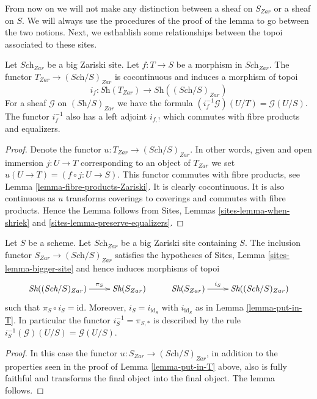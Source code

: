 \noindent
From now on we will not make any distinction between a sheaf on
$S_{Zar}$ or a sheaf on $S$. We will always use the procedures
of the proof of the lemma to go between the two notions.
Next, we esthablish some relationships between the topoi
associated to these sites.

\begin{lemma}
\label{lemma-put-in-T}
Let $\textit{Sch}_{Zar}$ be a big Zariski site.
Let $f : T \to S$ be a morphism in $\textit{Sch}_{Zar}$.
The functor $T_{Zar} \to (\textit{Sch}/S)_{Zar}$
is cocontinuous and induces a morphism of topoi
$$
i_f :
\textit{Sh}(T_{Zar})
\longrightarrow
\textit{Sh}((\textit{Sch}/S)_{Zar})
$$
For a sheaf $\mathcal{G}$ on $(\textit{Sh}/S)_{Zar}$
we have the formula $(i_f^{-1}\mathcal{G})(U/T) = \mathcal{G}(U/S)$.
The functor $i_f^{-1}$ also has a left adjoint $i_{f, !}$ which commutes
with fibre products and equalizers.
\end{lemma}

\begin{proof}
Denote the functor $u : T_{Zar} \to (\textit{Sch}/S)_{Zar}$.
In other words, given and open immersion $j : U \to T$ corresponding
to an object of $T_{Zar}$ we set $u(U \to T) = (f \circ j : U \to S)$.
This functor commutes with fibre products, see
Lemma \ref{lemma-fibre-products-Zariski}.
It is clearly cocontinuous.
It is also continuous as $u$ transforms coverings to coverings and
commutes with fibre products. Hence the Lemma follows from
Sites, Lemmas \ref{sites-lemma-when-shriek}
and \ref{sites-lemma-preserve-equalizers}.
\end{proof}

\begin{lemma}
\label{lemma-at-the-bottom}
Let $S$ be a scheme. Let $\textit{Sch}_{Zar}$ be a big Zariski
site containing $S$.
The inclusion functor $S_{Zar} \to (\textit{Sch}/S)_{Zar}$
satisfies the hypotheses of Sites, Lemma \ref{sites-lemma-bigger-site}
and hence induces morphisms of topoi
$$
\xymatrix{
\textit{Sh}((\textit{Sch}/S)_{Zar}) \ar[r]^-{\pi_S} &
\textit{Sh}(S_{Zar}) &
\textit{Sh}(S_{Zar}) \ar[r]^-{i_S} &
\textit{Sh}((\textit{Sch}/S)_{Zar})
}
$$
such that $\pi_S \circ i_S = \text{id}$. Moreover, $i_S = i_{\text{id}_S}$
with $i_{\text{id}_S}$ as in Lemma \ref{lemma-put-in-T}. In particular the
functor $i_S^{-1} = \pi_{S, *}$ is described by the rule
$i_S^{-1}(\mathcal{G})(U/S) = \mathcal{G}(U/S)$.
\end{lemma}

\begin{proof}
In this case the functor $u : S_{Zar} \to (\textit{Sch}/S)_{Zar}$,
in addition to the properties seen in the proof of
Lemma \ref{lemma-put-in-T} above, also is fully faithful
and transforms the final object into the final object.
The lemma follows.
\end{proof}


